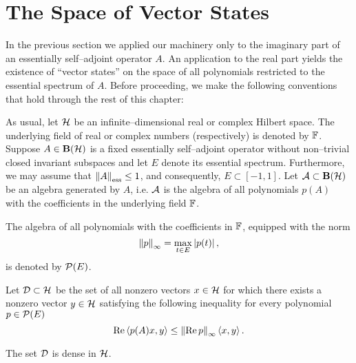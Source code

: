 \goodbreak
\section{The Space of Vector States}

In the previous section we applied our machinery only to the imaginary part
of an essentially self--adjoint operator $A$. An application to the real part
yields the existence of ``vector states'' on the space of all polynomials
restricted to the essential spectrum of $A$. Before proceeding, we make the
following conventions that hold through the rest of this chapter:

\bigskip

As usual, let ${\cal H}$ be an infinite--dimensional real or complex Hilbert space.
The underlying field of real or complex numbers (respectively) is denoted by
$\mathbb F$. Suppose $A\in\mathbf B(\cal H)$ is a fixed essentially self--adjoint operator
without non--trivial closed invariant subspaces and let $E$ denote its
essential spectrum. Furthermore, we may assume that $\essnorm{A}\leq1$, and
consequently, $E\subset[-1,1]$. Let ${\cal A}\subset\mathbf B(\cal H)$ be an algebra generated by
$A$, i.e. ${\cal A}$ is the algebra of all polynomials $p(A)$ with the coefficients
in the underlying field $\mathbb F$.

\medskip

\noindent The algebra of all polynomials with the coefficients in $\mathbb F$,
equipped with the norm
\[ \left\Vert p\right\Vert_\infty=\max_{t\in{E}} \left\vert p(t)\right\vert, \]
is denoted by ${\cal{P}}(E)$.

\smallskip

\begin{defn}
Let ${\cal{D}}\subset{\cal H}$ be the set of all nonzero vectors $x\in{\cal H}$ for which
there exists a nonzero vector $y\in{\cal H}$ satisfying the following inequality
for every polynomial $p\in{\cal{P}}(E)$
\begin{equation} \label{e:PF1}
  \RE\seq{p(A)x,y} \leq \norm{\RE p}_\infty\seq{x,y}.
\end{equation}
\end{defn}

\medskip

\goodbreak

\begin{lem}\label{l:PF1}
The set ${\cal{D}}$ is dense in ${\cal H}$.
\end{lem}

